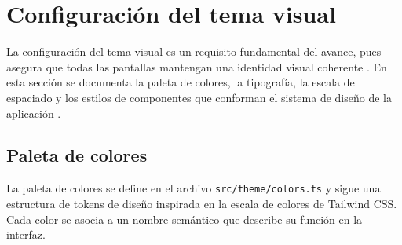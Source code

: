 
\section{Configuraci\'on del tema visual}

La configuraci\'on del tema visual es un requisito fundamental del avance,
pues asegura que todas las pantallas mantengan una identidad visual coherente
\citep{nielsen1994}. En esta secci\'on se documenta la paleta de colores, la
tipograf\'ia, la escala de espaciado y los estilos de componentes que
conforman el sistema de dise\~no de la aplicaci\'on \nombreApp{}.

\subsection{Paleta de colores}

La paleta de colores se define en el archivo \texttt{src/theme/colors.ts}
y sigue una estructura de tokens de dise\~no inspirada en la escala de
colores de Tailwind CSS. Cada color se asocia a un nombre sem\'antico que
describe su funci\'on en la interfaz.

